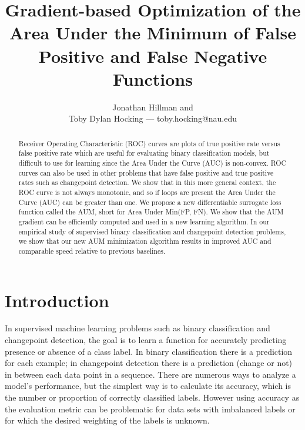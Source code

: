 \documentclass{article}
\begin{document}
\title{Gradient-based Optimization of the Area Under the Minimum of False Positive and False Negative Functions}
\author{Jonathan Hillman and \\
Toby Dylan Hocking --- toby.hocking@nau.edu}
\maketitle

\begin{abstract}
Receiver Operating Characteristic (ROC) curves are plots of true positive rate versus false positive rate which are useful for evaluating binary classification models, but difficult to use for learning since the Area Under the Curve (AUC) is non-convex.
ROC curves can also be used in other problems that have false positive and true positive rates such as changepoint detection.
We show that in this more general context, the ROC curve is not always monotonic, and so if loops are present the Area Under the Curve (AUC) can be greater than one.
We propose a new differentiable surrogate loss function called the AUM, short for Area Under Min(FP, FN).
We show that the AUM gradient can be efficiently computed and used in a new learning algorithm.
In our empirical study of supervised binary classification and changepoint detection problems, we show that our new AUM minimization algorithm results in improved AUC and comparable speed relative to previous baselines.
\end{abstract}

\section{Introduction}
\label{sec:introduction}
In supervised machine learning problems such as binary classification and changepoint detection, the goal is to learn a function for accurately predicting presence or absence of a class label.
In binary classification there is a prediction for each example; in changepoint detection there is a prediction (change or not) in between each data point in a sequence.
There are numerous ways to analyze a model's performance, but the simplest way is to calculate its accuracy, which is the number or proportion of correctly classified labels.
However using accuracy as the evaluation metric can be problematic for data sets with imbalanced labels or for which the desired weighting of the labels is unknown.
\end{document}
